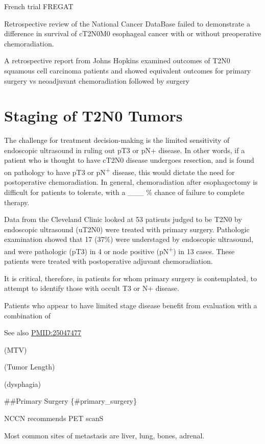 \documentclass[
]{book}
\begin{document}
French trial FREGAT\citep{markar59}

Retrospective review of the National Cancer DataBase failed to demonstrate a difference in survival of cT2N0M0 esophageal cancer with or without preoperative chemoradiation.\citep{speicher1195}

A retrospective report from Johns Hopkins examined outcomes of T2N0 squamous cell carcinoma patients and showed equivalent outcomes for primary surgery vs neoadjuvant chemoradiation followed by surgery \citep{zhang429}

\hypertarget{staging-of-t2n0-tumors}{%
\section{Staging of T2N0 Tumors}\label{staging-of-t2n0-tumors}}

The challenge for treatment decision-making is the limited sensitivity of endoscopic ultrasound in ruling out pT3 or pN+ disease. In other words, if a patient who is thought to have cT2N0 disease undergoes resection, and is found on pathology to have pT3 or pN\textsuperscript{+} disease, this would dictate the need for postoperative chemoradiation. In general, chemoradiation after esophagectomy is difficult for patients to tolerate, with a \_\_\_ \% chance of failure to complete therapy.

Data from the Cleveland Clinic looked at 53 patients judged to be T2N0 by endoscopic ultrasound (uT2N0) were treated with primary surgery. Pathologic examination showed that 17 (37\%) were understaged by endoscopic ultrasound, and were pathologic (pT3) in 4 or node positive (pN\textsuperscript{+}) in 13 cases. These patients were treated with postoperative adjuvant chemoradiation.\citep{rice317}

It is critical, therefore, in patients for whom primary surgery is contemplated, to attempt to identify those with occult T3 or N+ disease.

Patients who appear to have limited stage disease benefit from evaluation with a combination of

See also \url{PMID:25047477}

(MTV)

(Tumor Length)

(dysphagia)

\#\#Primary Surgery \{\#primary\_surgery\}

NCCN recommends PET scanS

Most common sites of metastasis are liver, lung, bones, adrenal.
\end{document}
